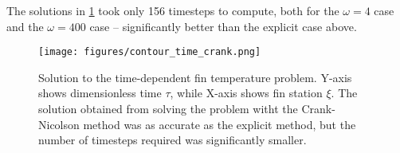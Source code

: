 \documentclass[10pt,letterpaper,notitlepage]{article}
\begin{document}
    The solutions in \cref{fig:contour_time_crank} took only 156 timesteps to compute, both for the $\omega=4$ case and the $\omega=400$ case -- significantly better than the explicit case above.
    \begin{figure}
        \texttt{[image: figures/contour\_time\_crank.png]}
        \caption[Crank Nicolson solution to time-dependent fin temperature]{Solution to the time-dependent fin temperature problem. Y-axis shows dimensionless time $\tau$, while X-axis shows fin station $\xi$. The solution obtained from solving the problem witht the Crank-Nicolson method was as accurate as the explicit method, but the number of timesteps required was significantly smaller.}
        \label{fig:contour_time_crank}
    \end{figure}

    
\end{document}

